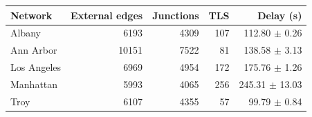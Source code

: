 \begin{tabular}{lrrrr}
\toprule
Network & External edges & Junctions & TLS & Delay (s) \\
\midrule
Albany & 6193 & 4309 & 107 & 112.80 $\pm$ 0.26 \\
Ann Arbor & 10151 & 7522 & 81 & 138.58 $\pm$ 3.13 \\
Los Angeles & 6969 & 4954 & 172 & 175.76 $\pm$ 1.26 \\
Manhattan & 5993 & 4065 & 256 & 245.31 $\pm$ 13.03 \\
Troy & 6107 & 4355 & 57 & 99.79 $\pm$ 0.84 \\
\bottomrule
\end{tabular}
